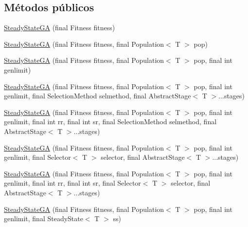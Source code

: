 \subsection*{Métodos públicos}
\begin{DoxyCompactItemize}
\item 
\hyperlink{classjenes_1_1algorithms_1_1_steady_state_g_a_3_01_t_01extends_01_chromosome_01_4_a0bd9f9195ccd7bb9f0a93bf467ee81d5}{Steady\-State\-G\-A} (final Fitness fitness)
\item 
\hyperlink{classjenes_1_1algorithms_1_1_steady_state_g_a_3_01_t_01extends_01_chromosome_01_4_a1fab107de8499953af703b619d2fc741}{Steady\-State\-G\-A} (final Fitness fitness, final Population$<$ T $>$ pop)
\item 
\hyperlink{classjenes_1_1algorithms_1_1_steady_state_g_a_3_01_t_01extends_01_chromosome_01_4_a6dba077ffc454a1863b7d15cecac32b4}{Steady\-State\-G\-A} (final Fitness fitness, final Population$<$ T $>$ pop, final int genlimit)
\item 
\hyperlink{classjenes_1_1algorithms_1_1_steady_state_g_a_3_01_t_01extends_01_chromosome_01_4_a5964a47d26b5831b9e821285e3e4cb8d}{Steady\-State\-G\-A} (final Fitness fitness, final Population$<$ T $>$ pop, final int genlimit, final Selection\-Method selmethod, final Abstract\-Stage$<$ T $>$...stages)
\item 
\hyperlink{classjenes_1_1algorithms_1_1_steady_state_g_a_3_01_t_01extends_01_chromosome_01_4_a7f95aed43d04c3290cc5fd98a569b6e0}{Steady\-State\-G\-A} (final Fitness fitness, final Population$<$ T $>$ pop, final int genlimit, final int rr, final int sr, final Selection\-Method selmethod, final Abstract\-Stage$<$ T $>$...stages)
\item 
\hyperlink{classjenes_1_1algorithms_1_1_steady_state_g_a_3_01_t_01extends_01_chromosome_01_4_a8dbf144ebf5f83e8d67e1e74c0e8c630}{Steady\-State\-G\-A} (final Fitness fitness, final Population$<$ T $>$ pop, final int genlimit, final Selector$<$ T $>$ selector, final Abstract\-Stage$<$ T $>$...stages)
\item 
\hyperlink{classjenes_1_1algorithms_1_1_steady_state_g_a_3_01_t_01extends_01_chromosome_01_4_a24e8cfdd1131b63cb1c3d086a6a09cf4}{Steady\-State\-G\-A} (final Fitness fitness, final Population$<$ T $>$ pop, final int genlimit, final int rr, final int sr, final Selector$<$ T $>$ selector, final Abstract\-Stage$<$ T $>$...stages)
\item 
\hyperlink{classjenes_1_1algorithms_1_1_steady_state_g_a_3_01_t_01extends_01_chromosome_01_4_a8e1b8939ca23670640b050dae1e239cc}{Steady\-State\-G\-A} (final Fitness fitness, final Population$<$ T $>$ pop, final int genlimit, final Steady\-State$<$ T $>$ ss)
\end{DoxyCompactItemize}
